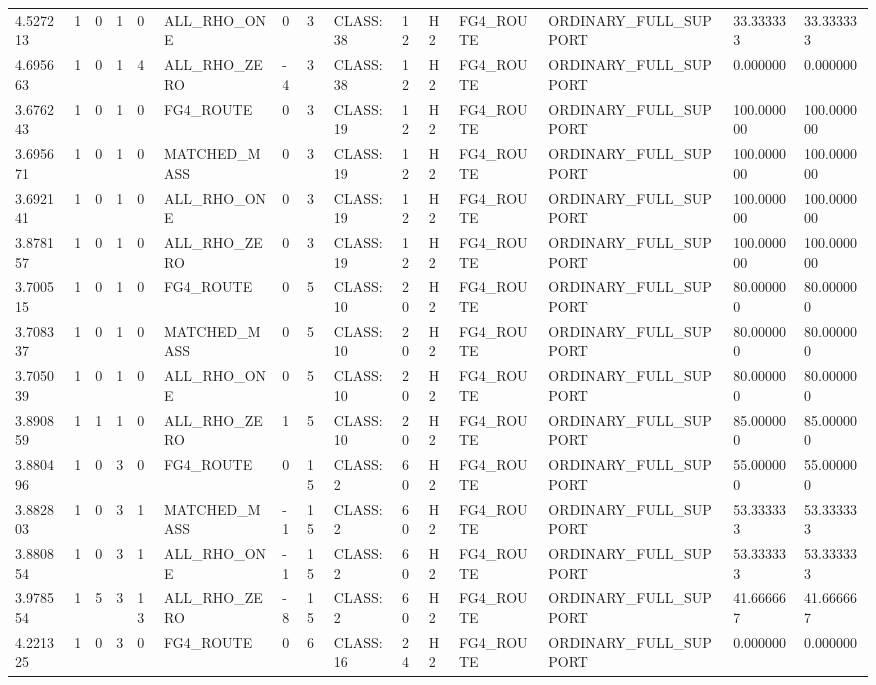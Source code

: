 \begin{tabular}{lllllllllllllll}
4.527213 & 1 & 0 & 1 & 0 & ALL\_RHO\_ONE & 0 & 3 & CLASS:38 & 12 & H2 & FG4\_ROUTE & ORDINARY\_FULL\_SUPPORT & 33.333333 & 33.333333 \\
4.695663 & 1 & 0 & 1 & 4 & ALL\_RHO\_ZERO & -4 & 3 & CLASS:38 & 12 & H2 & FG4\_ROUTE & ORDINARY\_FULL\_SUPPORT & 0.000000 & 0.000000 \\
3.676243 & 1 & 0 & 1 & 0 & FG4\_ROUTE & 0 & 3 & CLASS:19 & 12 & H2 & FG4\_ROUTE & ORDINARY\_FULL\_SUPPORT & 100.000000 & 100.000000 \\
3.695671 & 1 & 0 & 1 & 0 & MATCHED\_MASS & 0 & 3 & CLASS:19 & 12 & H2 & FG4\_ROUTE & ORDINARY\_FULL\_SUPPORT & 100.000000 & 100.000000 \\
3.692141 & 1 & 0 & 1 & 0 & ALL\_RHO\_ONE & 0 & 3 & CLASS:19 & 12 & H2 & FG4\_ROUTE & ORDINARY\_FULL\_SUPPORT & 100.000000 & 100.000000 \\
3.878157 & 1 & 0 & 1 & 0 & ALL\_RHO\_ZERO & 0 & 3 & CLASS:19 & 12 & H2 & FG4\_ROUTE & ORDINARY\_FULL\_SUPPORT & 100.000000 & 100.000000 \\
3.700515 & 1 & 0 & 1 & 0 & FG4\_ROUTE & 0 & 5 & CLASS:10 & 20 & H2 & FG4\_ROUTE & ORDINARY\_FULL\_SUPPORT & 80.000000 & 80.000000 \\
3.708337 & 1 & 0 & 1 & 0 & MATCHED\_MASS & 0 & 5 & CLASS:10 & 20 & H2 & FG4\_ROUTE & ORDINARY\_FULL\_SUPPORT & 80.000000 & 80.000000 \\
3.705039 & 1 & 0 & 1 & 0 & ALL\_RHO\_ONE & 0 & 5 & CLASS:10 & 20 & H2 & FG4\_ROUTE & ORDINARY\_FULL\_SUPPORT & 80.000000 & 80.000000 \\
3.890859 & 1 & 1 & 1 & 0 & ALL\_RHO\_ZERO & 1 & 5 & CLASS:10 & 20 & H2 & FG4\_ROUTE & ORDINARY\_FULL\_SUPPORT & 85.000000 & 85.000000 \\
3.880496 & 1 & 0 & 3 & 0 & FG4\_ROUTE & 0 & 15 & CLASS:2 & 60 & H2 & FG4\_ROUTE & ORDINARY\_FULL\_SUPPORT & 55.000000 & 55.000000 \\
3.882803 & 1 & 0 & 3 & 1 & MATCHED\_MASS & -1 & 15 & CLASS:2 & 60 & H2 & FG4\_ROUTE & ORDINARY\_FULL\_SUPPORT & 53.333333 & 53.333333 \\
3.880854 & 1 & 0 & 3 & 1 & ALL\_RHO\_ONE & -1 & 15 & CLASS:2 & 60 & H2 & FG4\_ROUTE & ORDINARY\_FULL\_SUPPORT & 53.333333 & 53.333333 \\
3.978554 & 1 & 5 & 3 & 13 & ALL\_RHO\_ZERO & -8 & 15 & CLASS:2 & 60 & H2 & FG4\_ROUTE & ORDINARY\_FULL\_SUPPORT & 41.666667 & 41.666667 \\
4.221325 & 1 & 0 & 3 & 0 & FG4\_ROUTE & 0 & 6 & CLASS:16 & 24 & H2 & FG4\_ROUTE & ORDINARY\_FULL\_SUPPORT & 0.000000 & 0.000000 \\

\end{tabular}
